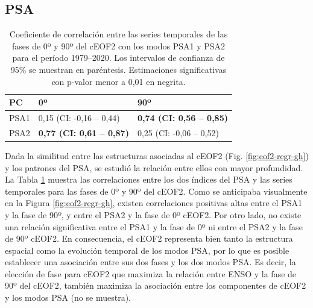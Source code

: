 \documentclass[12pt,oneside,a4paper]{reedthesis}
\begin{document}
\hypertarget{psa}{%
\subsection{PSA}\label{psa}}



\begin{table}

\caption{\label{tab:psa-eof2}Coeficiente de correlación entre las series temporales de las fases de 0º y 90º del cEOF2 con los modos PSA1 y PSA2 para el período 1979--2020. Los intervalos de confianza de 95\% se muestran en paréntesis. Estimaciones significativas con p-valor menor a 0,01 en negrita.}
\centering
\begin{tabular}[t]{l>{}l>{}l}
\toprule
PC & 0º & 90º\\
\midrule
PSA1 & 0,15 (CI: -0,16 -- 0,44) & \textbf{0,74 (CI: 0,56 -- 0,85)}\\
\cmidrule{1-3}
PSA2 & \textbf{0,77 (CI: 0,61 -- 0,87)} & 0,25 (CI: -0,06 -- 0,52)\\
\bottomrule
\end{tabular}
\end{table}

Dada la similitud entre las estructuras asociadas al cEOF2 (Fig. \ref{fig:eof2-regr-gh}) y los patrones del PSA, se estudió la relación entre ellos con mayor profundidad.
La Tabla \ref{tab:psa-eof2} muestra las correlaciones entre los dos índices del PSA y las series temporales para las fases de 0º y 90º del cEOF2.
Como se anticipaba visualmente en la Figura \ref{fig:eof2-regr-gh}, existen correlaciones positivas altas entre el PSA1 y la fase de 90º, y entre el PSA2 y la fase de 0º cEOF2.
Por otro lado, no existe una relación significativa entre el PSA1 y la fase de 0º ni entre el PSA2 y la fase de 90º cEOF2.
En consecuencia, el cEOF2 representa bien tanto la estructura espacial como la evolución temporal de los modos PSA, por lo que es posible establecer una asociación entre sus dos fases y los dos modos PSA.
Es decir, la elección de fase para cEOF2 que maximiza la relación entre ENSO y la fase de 90º del cEOF2, también maximiza la asociación entre los componentes de cEOF2 y los modos PSA (no se muestra).
\end{document}
